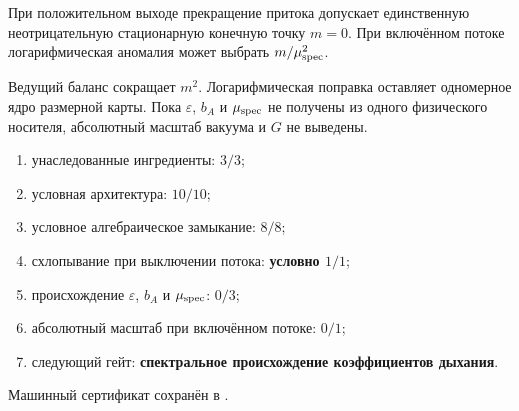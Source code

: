 \begin{theorem}
При положительном выходе прекращение притока допускает единственную
неотрицательную стационарную конечную точку $m=0$. При включённом потоке
логарифмическая аномалия может выбрать $m/\mu_{\rm spec}^2$.
\end{theorem}

\begin{nogocriterion}
Ведущий баланс сокращает $m^2$. Логарифмическая поправка оставляет
одномерное ядро размерной карты. Пока $\varepsilon$, $b_A$ и
$\mu_{\rm spec}$ не получены из одного физического носителя, абсолютный
масштаб вакуума и $G$ не выведены.
\end{nogocriterion}

\begin{protocol}\begin{enumerate}
\item унаследованные ингредиенты: \textbf{$3/3$};
\item условная архитектура: \textbf{$10/10$};
\item условное алгебраическое замыкание: \textbf{$8/8$};
\item схлопывание при выключении потока: \textbf{условно $1/1$};
\item происхождение $\varepsilon$, $b_A$ и $\mu_{\rm spec}$: \textbf{$0/3$};
\item абсолютный масштаб при включённом потоке: \textbf{$0/1$};
\item следующий гейт: \textbf{спектральное происхождение коэффициентов дыхания}.
\end{enumerate}\end{protocol}

Машинный сертификат сохранён в
.